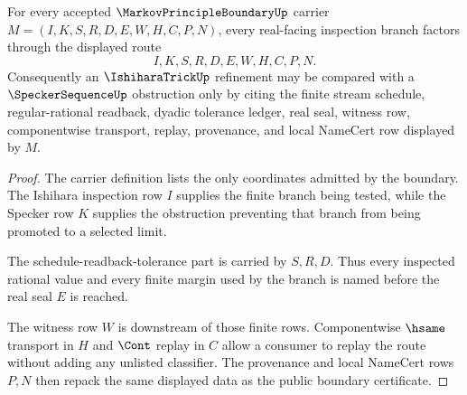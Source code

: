 \begin{theorem}
\label{thm:markov-principle-boundary-ishihara-specker-route}
For every accepted $\MarkovPrincipleBoundaryUp$ carrier $M=(I,K,S,R,D,E,W,H,C,P,N)$, every real-facing inspection branch factors through the displayed route
$$
I,K,S,R,D,E,W,H,C,P,N.
$$
Consequently an $\IshiharaTrickUp$ refinement may be compared with a $\SpeckerSequenceUp$ obstruction only by citing the finite stream schedule, regular-rational readback, dyadic tolerance ledger, real seal, witness row, componentwise transport, replay, provenance, and local NameCert row displayed by $M$.
\end{theorem}
\begin{proof}
The carrier definition lists the only coordinates admitted by the boundary. The Ishihara inspection row $I$ supplies the finite branch being tested, while the Specker row $K$ supplies the obstruction preventing that branch from being promoted to a selected limit.

The schedule-readback-tolerance part is carried by $S,R,D$. Thus every inspected rational value and every finite margin used by the branch is named before the real seal $E$ is reached.

The witness row $W$ is downstream of those finite rows. Componentwise $\hsame$ transport in $H$ and $\Cont$ replay in $C$ allow a consumer to replay the route without adding any unlisted classifier. The provenance and local NameCert rows $P,N$ then repack the same displayed data as the public boundary certificate.
\end{proof}

